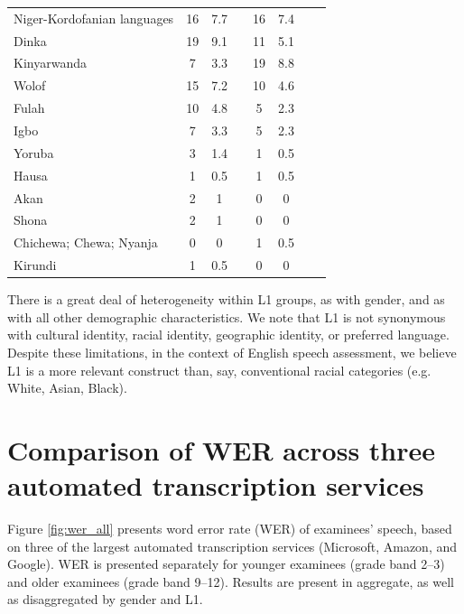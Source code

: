 \documentclass [PhD] {uclathes}
\begin{document}
\begin{table}[htbp]
\begin{tabular}{lccccccc}
\hspace{3mm} Niger-Kordofanian languages & 16 & 7.7 & & 16 & 7.4 \\
\hspace{3mm} Dinka & 19 & 9.1 & & 11 & 5.1 \\
\hspace{3mm} Kinyarwanda & 7 & 3.3 & & 19 & 8.8 \\
\hspace{3mm} Wolof & 15 & 7.2 & & 10 & 4.6 \\
\hspace{3mm} Fulah & 10 & 4.8 & & 5 & 2.3 \\
\hspace{3mm} Igbo & 7 & 3.3 & & 5 & 2.3 \\
\hspace{3mm} Yoruba & 3 & 1.4 & & 1 & 0.5 \\
\hspace{3mm} Hausa & 1 & 0.5 & & 1 & 0.5 \\
\hspace{3mm} Akan & 2 & 1 & & 0 & 0 \\
\hspace{3mm} Shona & 2 & 1 & & 0 & 0 \\
\hspace{3mm} Chichewa; Chewa; Nyanja & 0 & 0 & & 1 & 0.5 \\
\hspace{3mm} Kirundi & 1 & 0.5 & & 0 & 0 \\
    \bottomrule
    \end{tabular}
\end{table}

There is a great deal of heterogeneity within L1 groups, as with gender, and as with all other demographic characteristics. We note that L1 is not synonymous with cultural identity, racial identity, geographic identity, or preferred language. Despite these limitations, in the context of English speech assessment, we believe L1 is a more relevant construct than, say, conventional racial categories (e.g. White, Asian, Black). 

\section{Comparison of WER across three automated transcription services}
\label{sec:appendix_wer}

Figure \ref{fig:wer_all} presents word error rate (WER) of examinees’ speech, based on three of the largest automated transcription services (Microsoft, Amazon, and Google). WER is presented separately for younger examinees (grade band 2–3) and older examinees (grade band 9–12). Results are present in aggregate, as well as disaggregated by gender and L1. 
\end{document}

